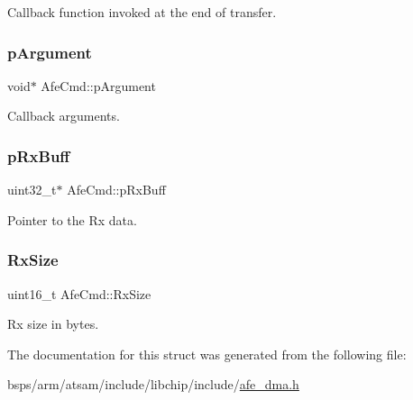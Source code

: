 Callback function invoked at the end of transfer. \mbox{\label{structAfeCmd_ad5547df2ec1a00f7e25465a0093349f8}} 
\subsubsection{\texorpdfstring{pArgument}{pArgument}}
{\footnotesize\ttfamily void$\ast$ Afe\+Cmd\+::p\+Argument}

Callback arguments. \mbox{\label{structAfeCmd_ab8d8985b071433f46a697212abdbde66}} 
\subsubsection{\texorpdfstring{pRxBuff}{pRxBuff}}
{\footnotesize\ttfamily uint32\+\_\+t$\ast$ Afe\+Cmd\+::p\+Rx\+Buff}

Pointer to the Rx data. \mbox{\label{structAfeCmd_ac9f33a4b9f53311a46955112a911e89b}} 
\subsubsection{\texorpdfstring{RxSize}{RxSize}}
{\footnotesize\ttfamily uint16\+\_\+t Afe\+Cmd\+::\+Rx\+Size}

Rx size in bytes. 

The documentation for this struct was generated from the following file\+:\begin{DoxyCompactItemize}
\item 
bsps/arm/atsam/include/libchip/include/\mbox{\hyperlink{afe__dma_8h}{afe\+\_\+dma.\+h}}\end{DoxyCompactItemize}
